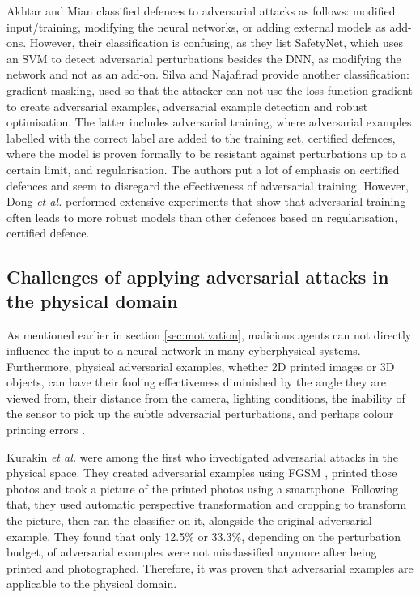 \documentclass[11pt, a4paper, oneside]{article}
\begin{document}
Akhtar and Mian \cite{akhtar} classified defences to adversarial attacks as follows: modified input/training, modifying the neural networks, or adding external models as add-ons. However, their classification is confusing, as they list SafetyNet, which uses an SVM to detect adversarial perturbations besides the DNN, as modifying the network and not as an add-on. Silva and Najafirad \cite{silva_survey} provide another classification: gradient masking, used so that the attacker can not use the loss function gradient to create adversarial examples, adversarial example detection and robust optimisation. The latter includes adversarial training, where adversarial examples labelled with the correct label are added to the training set, certified defences, where the model is proven formally to be resistant against perturbations up to a certain limit, and regularisation. The authors put a lot of emphasis on certified defences and seem to disregard the effectiveness of adversarial training. However, Dong \textit{et al.} \cite{dong2020benchmarking} performed extensive experiments that show that adversarial training often leads to more robust models than other defences based on regularisation, certified defence.

\subsection{Challenges of applying adversarial attacks in the physical domain}

As mentioned earlier in section \ref{sec:motivation}, malicious agents can not directly influence the input to a neural network in many cyberphysical systems. Furthermore, physical adversarial examples, whether 2D printed images or 3D objects, can have their fooling effectiveness diminished by the angle they are viewed from, their distance from the camera, lighting conditions, the inability of the sensor to pick up the subtle adversarial perturbations, and perhaps colour printing errors \cite{kurakin2016adversarial, athalye, evtimov_road_signs}.

Kurakin \textit{et al.} \cite{kurakin2016adversarial} were among the first who invectigated adversarial attacks in the physical space. They created adversarial examples using FGSM \cite{fgsm}, printed those photos and took a picture of the printed photos using a smartphone. Following that, they used automatic perspective transformation and cropping to transform the picture, then ran the classifier on it, alongside the original adversarial example. They found that only 12.5\% or 33.3\%, depending on the perturbation budget, of adversarial examples were not misclassified anymore after being printed and photographed. Therefore, it was proven that adversarial examples are applicable to the physical domain.
\end{document}

